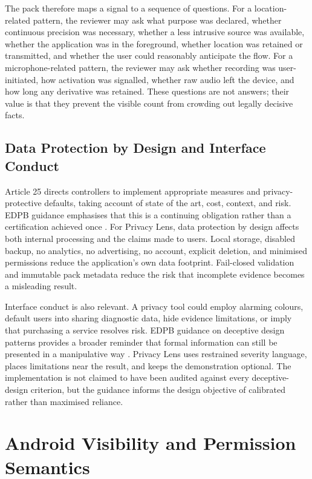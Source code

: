 The pack therefore maps a signal to a sequence of questions. For a location-related pattern, the reviewer may ask what purpose was declared, whether continuous precision was necessary, whether a less intrusive source was available, whether the application was in the foreground, whether location was retained or transmitted, and whether the user could reasonably anticipate the flow. For a microphone-related pattern, the reviewer may ask whether recording was user-initiated, how activation was signalled, whether raw audio left the device, and how long any derivative was retained. These questions are not answers; their value is that they prevent the visible count from crowding out legally decisive facts.

\subsection{Data Protection by Design and Interface Conduct}

Article 25 directs controllers to implement appropriate measures and privacy-protective defaults, taking account of state of the art, cost, context, and risk. EDPB guidance emphasises that this is a continuing obligation rather than a certification achieved once \cite{edpbArticle25}. For Privacy Lens, data protection by design affects both internal processing and the claims made to users. Local storage, disabled backup, no analytics, no advertising, no account, explicit deletion, and minimised permissions reduce the application's own data footprint. Fail-closed validation and immutable pack metadata reduce the risk that incomplete evidence becomes a misleading result.

Interface conduct is also relevant. A privacy tool could employ alarming colours, default users into sharing diagnostic data, hide evidence limitations, or imply that purchasing a service resolves risk. EDPB guidance on deceptive design patterns provides a broader reminder that formal information can still be presented in a manipulative way \cite{edpbDeceptiveDesign}. Privacy Lens uses restrained severity language, places limitations near the result, and keeps the demonstration optional. The implementation is not claimed to have been audited against every deceptive-design criterion, but the guidance informs the design objective of calibrated rather than maximised reliance.

\section{Android Visibility and Permission Semantics}

